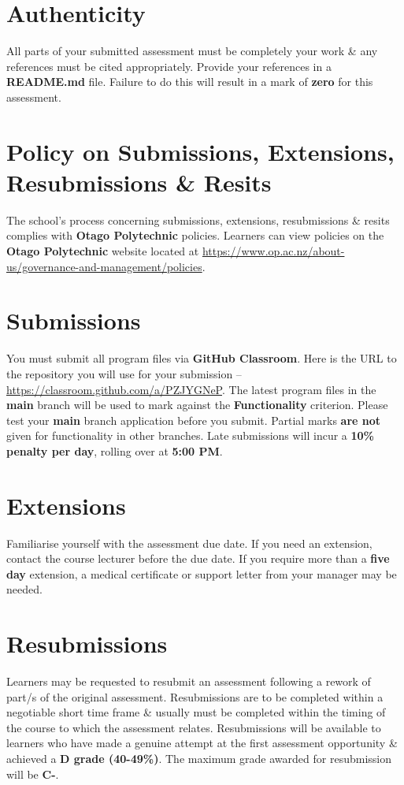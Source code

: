 \documentclass{article}
\begin{document}
\section*{Authenticity}
All parts of your submitted assessment must be completely your work \& any references must be cited appropriately. Provide your references in a \textbf{README.md} file. Failure to do this will result in a mark of \textbf{zero} for this assessment.

\section*{Policy on Submissions, Extensions, Resubmissions \& Resits}
The school's process concerning submissions, extensions, resubmissions \& resits complies with \textbf{Otago Polytechnic} policies. Learners can view policies on the \textbf{Otago Polytechnic} website located at \href{https://www.op.ac.nz/about-us/governance-and-management/policies}{https://www.op.ac.nz/about-us/governance-and-management/policies}.

\section*{Submissions}
You must submit all program files via \textbf{GitHub Classroom}. Here is the URL to the repository you will use for your submission – \href{https://classroom.github.com/a/PZJYGNeP}{https://classroom.github.com/a/PZJYGNeP}. The latest program files in the \textbf{main} branch will be used to mark against the \textbf{Functionality} criterion. Please test your \textbf{main} branch application before you submit. Partial marks \textbf{are not} given for functionality in other branches. Late submissions will incur a \textbf{10\% penalty per day}, rolling over at \textbf{5:00 PM}.

\section*{Extensions}
Familiarise yourself with the assessment due date. If you need an extension, contact the course lecturer before the due date. If you require more than a \textbf{five day} extension, a medical certificate or support letter from your manager may be needed.

\section*{Resubmissions}
Learners may be requested to resubmit an assessment following a rework of part/s of the original assessment. Resubmissions are to be completed within a negotiable short time frame \& usually must be completed within the timing of the course to which the assessment relates. Resubmissions will be available to learners who have made a genuine attempt at the first assessment opportunity \& achieved a \textbf{D grade (40-49\%)}. The maximum grade awarded for resubmission will be \textbf{C-}.
\end{document}
